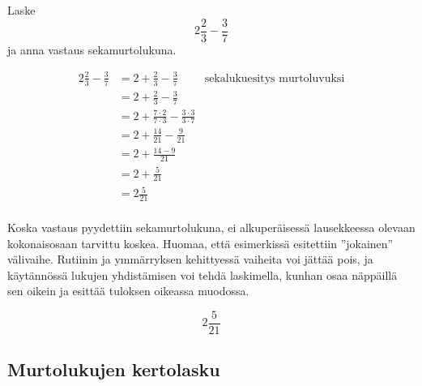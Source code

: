 \begin{esimerkki} %
        Laske \[2\frac{2}{3} - \frac{3}{7}\] ja anna vastaus sekamurtolukuna.
        \begin{esimratk}
        \begin{align*}
            2\frac{2}{3} - \frac{3}{7}&=2+\frac{2}{3} - \frac{3}{7} & \text{sekalukuesitys murtoluvuksi}\\
            &=2+\frac{2}{3} - \frac{3}{7}\\
            &=2+\frac{7\cdot 2}{7\cdot3}-\frac{3\cdot3}{3\cdot 7}\\
            &=2+\frac{14}{21}-\frac{9}{21}\\
            &=2+\frac{14-9}{21}\\
            &=2+\frac{5}{21}\\
            &=2\frac{5}{21}\\
        \end{align*}

        Koska vastaus pyydettiin sekamurtolukuna, ei alkuperäisessä lausekkeessa olevaan kokonaisosaan tarvittu koskea. Huomaa, että esimerkissä esitettiin ''jokainen'' välivaihe. Rutiinin ja ymmärryksen kehittyessä vaiheita voi jättää pois, ja käytännössä lukujen yhdistämisen voi tehdä laskimella, kunhan osaa näppäillä sen oikein ja esittää tuloksen oikeassa muodossa.     
        \end{esimratk}
        \begin{esimvast}
$$2\frac{5}{21}$$
        \end{esimvast}
    \end{esimerkki}

    
\subsection{Murtolukujen kertolasku}
    
